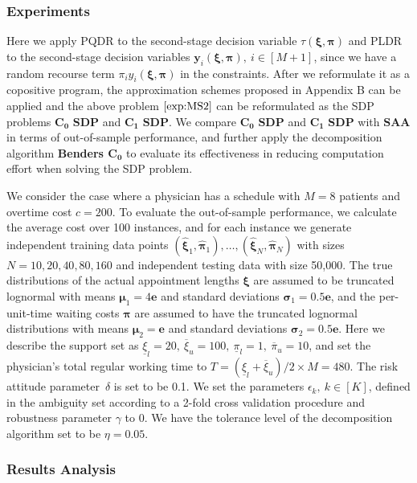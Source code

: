 \documentclass{article}
\begin{document}
\subsubsection{Experiments}

Here we apply PQDR to the second-stage decision variable $\tau(\bm \xi, \bm \pi)$ and PLDR to the second-stage decision variables $\bm y_i(\bm \xi, \bm \pi),\ i \in [M+1]$, since we have a random recourse term $\pi_i y_i(\bm \xi, \bm \pi)$ in the constraints. After we reformulate it as a copositive program, the approximation schemes proposed in Appendix B can be applied and the above problem $\eqref{exp:MS2}$ can be reformulated as the SDP problems $\textbf{$\mathbf{C_0}$ SDP}$ and $\textbf{$\mathbf{C_1}$ SDP}$. We compare $\textbf{$\mathbf{C_0}$ SDP}$ and $\textbf{$\mathbf{C_1}$ SDP}$ with $\textbf{SAA}$ in terms of out-of-sample performance, and further apply the decomposition algorithm \textbf{Benders $\mathbf{C_0}$} to evaluate its effectiveness in reducing computation effort when solving the SDP problem.
 	
We consider the case where a physician has a schedule with $M=8$ patients and overtime cost $c=200$. To evaluate the out-of-sample performance, we calculate the average cost over 100 instances, and for each instance we generate independent training data points $(\hat{\bm \xi}_1, \hat{\bm \pi}_1),\ldots,(\hat{\bm \xi}_N, \hat{\bm \pi}_N)$ with sizes $N = 10,20,40,80,160$ and independent testing data with size 50,000. The true distributions of the actual appointment lengths $\bm \xi$ are assumed to be truncated lognormal with means $\bm \mu_1 = 4 \mathbf{e}$ and standard deviations $\bm \sigma_1 = 0.5\mathbf{e}$, and the per-unit-time waiting costs $\bm \pi$ are assumed to have the truncated lognormal distributions with means $\bm \mu_2 = \mathbf{e}$ and standard deviations $\bm \sigma_2 = 0.5\mathbf{e}$. Here we describe the support set as $\underline{\xi}_l = 20, \ \overline{\xi}_u = 100, \ \underline{\pi}_l = 1, \ \overline{\pi}_u = 10$, and set the physician’s total regular working time to $T = (\underline{\xi}_l+\overline{\xi}_u)/2 \times M = 480$. The risk attitude parameter~$\delta$ is set to be 0.1. We set the parameters $\epsilon_k, \  k \in [K]$, defined in the ambiguity set according to a 2-fold cross validation procedure and robustness parameter $\gamma$ to  0. We have the tolerance level of the decomposition algorithm set to be $\eta = 0.05$.

\subsubsection{Results Analysis}
 
\end{document}
